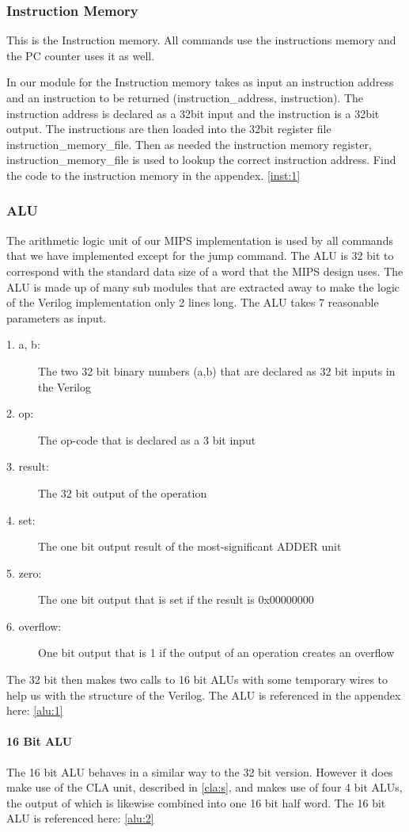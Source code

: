 \documentclass{llncs}
\begin{document}
\subsubsection{Instruction Memory}
This is the Instruction memory.  All commands use the instructions
memory and the PC counter uses it as well.

In our module for the Instruction memory takes as input an instruction
address and an instruction to be returned (instruction\_address,
instruction). The instruction address is declared as a 32bit input and
the instruction is a 32bit output. The instructions are then loaded
into the 32bit register file instruction\_memory\_file.  Then as
needed the instruction memory register, instruction\_memory\_file is
used to lookup the correct instruction address.  Find the code to the
instruction memory in the appendex. \ref{inst:1}
 
\subsubsection{ALU}
The arithmetic logic unit of our MIPS implementation is used by all commands that we have implemented except for the jump command.  The ALU is 32 bit to correspond with the standard data size of a word that the MIPS design uses. The ALU is made up of many sub modules that are extracted away to make the logic of the Verilog implementation only 2 lines long.  The ALU takes 7 reasonable parameters as input.
\begin{description}
\item[1. a, b: ] The two 32 bit binary numbers (a,b) that are declared as 32 bit inputs in the Verilog
\item[2. op: ] The op-code that is declared as a 3 bit input
\item[3. result: ] The 32 bit output of the operation 
\item[4. set: ] The one bit output result of the most-significant ADDER unit
\item[5. zero: ] The one bit output that is set if the result is 0x00000000
\item[6. overflow: ] One bit output that is 1 if the output of an operation creates an overflow
\end{description}

The 32 bit then makes two calls to 16 bit ALUs with some temporary wires to help us with the structure of the Verilog. The ALU is referenced in the appendex here: \ref{alu:1}
\paragraph{16 Bit ALU}
The 16 bit ALU behaves in a similar way to the 32 bit version.  However it does make use of the CLA unit, described in \ref{cla:s}, and makes use of four 4 bit ALUs, the output of which is likewise combined into one 16 bit half word.  The 16 bit ALU is referenced here: \ref{alu:2}
\end{document}
